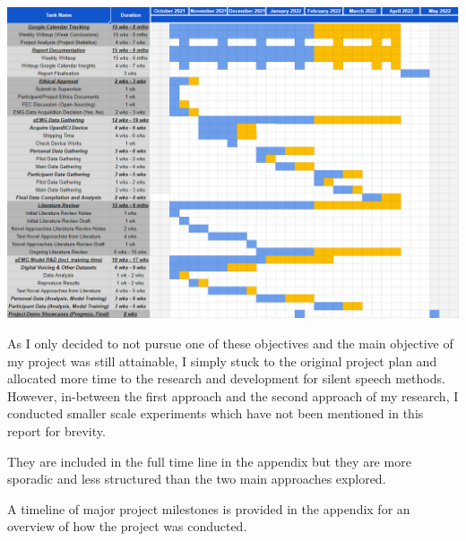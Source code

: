 \begin{center}
\includegraphics[scale=0.3]{graphics/planning/original_plan.png}
\end{center}

As I only decided to not pursue one of these objectives and
the main objective of my project was still attainable, I
simply stuck to the original project plan and allocated more
time to the research and development for silent speech
methods. However, in-between the first approach and the
second approach of my research, I conducted smaller scale
experiments which have not been mentioned in this report
for brevity.

They are included in the full time line in
the appendix but they are more sporadic and less structured
than the two main approaches explored.

A timeline of major project milestones is provided in the
appendix for an overview of how the project was conducted.